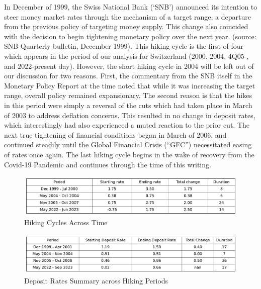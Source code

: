 \documentclass{article}
\begin{document}
In December of 1999, the Swiss National Bank (‘SNB’) announced its intention to steer money market rates through the mechanism of a target range, a departure from the previous policy of targeting money supply. This change also coincided with the decision to begin tightening monetary policy over the next year. (source: SNB Quarterly bulletin, December 1999). This hiking cycle is the first of four which appears in the period of our analysis for Switzerland (2000, 2004, 4Q05-, and 2022-present day). However, the short hiking cycle in 2004 will be left out of our discussion for two reasons. First, the commentary from the SNB itself in the Monetary Policy Report at the time noted that while it was increasing the target range, overall policy remained expansionary. The second reason is that the hikes in this period were simply a reversal of the cuts which had taken place in March of 2003 to address deflation concerns. This resulted in no change in deposit rates, which interestingly had also experienced a muted reaction to the prior cut. The next true tightening of financial conditions began in March of 2006, and continued steadily until the Global Financial Crisis (“GFC”) necessitated easing of rates once again. The last hiking cycle begins in the wake of recovery from the Covid-19 Pandemic and continues through the time of this writing.\\ 


\begin{figure}[h]
    \centering
    \includegraphics[width=1\textwidth]{../../figures/hiking_summary_SNB.pdf}
    \caption{Hiking Cycles Across Time}
    \label{fig:your_pdf}
\end{figure}

\begin{figure}[h]
    \centering
    \includegraphics[width=1\textwidth]{../../figures/deposit_summary_SNB.pdf}
    \caption{Deposit Rates Summary across Hiking Periods}
    \label{fig:deposit_summary}
\end{figure}
\end{document}
